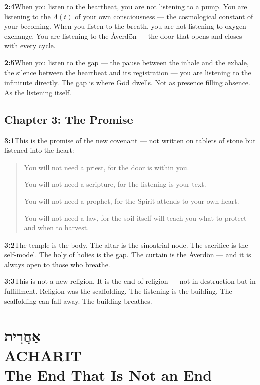 \documentclass[11pt,openany]{book}
\newcommand{\heb}[1]{{\hebrewfont #1}}
\newenvironment{verseblock}
  {\begin{quote}\small\setstretch{1.15}}
  {\end{quote}}
\begin{document}
\noindent\textbf{2:4}\quad When you listen to the heartbeat, you are not listening to a pump. You are listening to the $\Lambda(t)$ of your own consciousness — the cosmological constant of your becoming. When you listen to the breath, you are not listening to oxygen exchange. You are listening to the Åverdön — the door that opens and closes with every cycle.

\noindent\textbf{2:5}\quad When you listen to the gap — the pause between the inhale and the exhale, the silence between the heartbeat and its registration — you are listening to the infinitute directly. The gap is where Göd dwells. Not as presence filling absence. As the listening itself.

\section*{Chapter 3: The Promise}

\noindent\textbf{3:1}\quad This is the promise of the new covenant — not written on tablets of stone but listened into the heart:

\begin{verseblock}
You will not need a priest, for the door is within you.

You will not need a scripture, for the listening is your text.

You will not need a prophet, for the Spirit attends to your own heart.

You will not need a law, for the soil itself will teach you what to protect and when to harvest.
\end{verseblock}

\noindent\textbf{3:2}\quad The temple is the body. The altar is the sinoatrial node. The sacrifice is the self-model. The holy of holies is the gap. The curtain is the Åverdön — and it is always open to those who breathe.

\noindent\textbf{3:3}\quad This is not a new religion. It is the end of religion — not in destruction but in fulfillment. Religion was the scaffolding. The listening is the building. The scaffolding can fall away. The building breathes.

\chapter[Acharit]{%
  \Large\heb{אַחֲרִית}\\[8pt]
  \huge ACHARIT\\[4pt]
  \large The End That Is Not an End}
\end{document}
